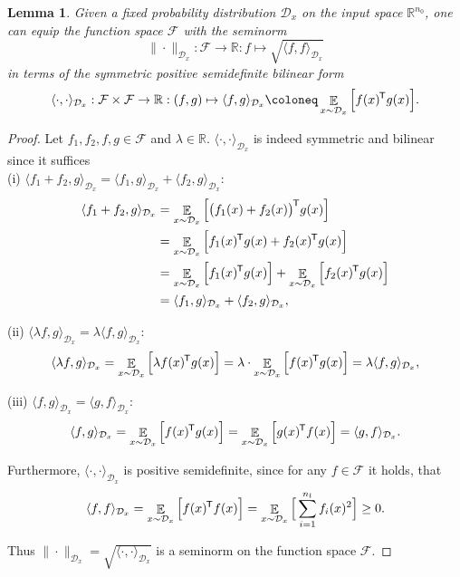 \documentclass[11pt, a4paper]{article}
\newtheorem{lemma}[theorem]{Lemma}
\newcommand{\R}{\mathbb{R}}
\newcommand{\D}{\mathcal{D}}
\newcommand{\F}{\mathcal{F}}
\newcommand*{\tr}{^{\mkern-1.5mu\mathsf{T}}}
\DeclareMathOperator*{\E}{\mathbb{E}}
\begin{document}
\begin{lemma}
Given a fixed probability distribution $\D_x$ on the input space $\R^{n_0}$, one can equip the function space $\F$ with the seminorm
\[ \| \cdot \|_{\D_x} : \F \to \R : f \mapsto \sqrt{\langle f , f \rangle_{\D_x}} \] 
in terms of the symmetric positive semidefinite bilinear form
\[ \langle \cdot,\cdot \rangle_{\D_x} : \F \times \F \to \R : (f,g) \mapsto \langle f,g \rangle_{\D_x} \coloneq \E_{x \sim \D_x} \Big [ f(x)\tr g(x) \Big ].\]
\end{lemma}

\begin{proof}
Let $f_1, f_2, f, g \in \F$ and $\lambda \in \R$. $\langle \cdot,\cdot \rangle_{\D_x}$ is indeed symmetric and bilinear since it suffices \\

(i) $\langle f_1 + f_2 , g \rangle_{\D_x} = \langle f_1 , g \rangle_{\D_x} + \langle f_2 , g \rangle_{\D_x}$:
\[ \begin{split}
\langle f_1 + f_2 , g \rangle_{\D_x}
&= \E_{x \sim \D_x} \Big [ \big ( f_1(x) + f_2(x) \big )\tr g(x) \Big ] \\\
&= \E_{x \sim \D_x} \Big [ f_1(x)\tr g(x) + f_2(x)\tr g(x) \Big ] \\\
&= \E_{x \sim \D_x} \Big [ f_1(x)\tr g(x) \Big ] + \E_{x \sim \D_x} \Big [ f_2(x)\tr g(x) \Big ] \\\
&= \langle f_1 , g \rangle_{\D_x} + \langle f_2 , g \rangle_{\D_x},
\end{split} \]

(ii) $\langle \lambda f , g \rangle_{\D_x} = \lambda \langle f, g \rangle_{\D_x}$:
\[ \langle \lambda f , g \rangle_{\D_x} = \E_{x \sim \D_x} \Big [ \lambda f(x)\tr g(x) \Big ] = \lambda \cdot \E_{x \sim \D_x} \Big [ f(x)\tr g(x) \Big ] = \lambda \langle f, g \rangle_{\D_x}, \]

(iii) $\langle f , g \rangle_{\D_x} = \langle g , f \rangle_{\D_x}$:
\[ \langle f , g \rangle_{\D_x} = \E_{x \sim \D_x} \Big [ f(x)\tr g(x) \Big ] = \E_{x \sim \D_x} \Big [ g(x)\tr f(x) \Big ] = \langle g , f \rangle_{\D_x}. \]

Furthermore, $\langle \cdot,\cdot \rangle_{\D_x}$ is positive semidefinite, since for any $f \in \F$ it holds, that
\[ \langle f , f \rangle_{\D_x} =  \E_{x \sim \D_x} \Big [ f(x)\tr f(x) \Big ] = \E_{x \sim \D_x} \Big [ \sum_{i=1}^{n_l} f_i(x)^2 \Big ] \geq 0. \]

Thus $\| \cdot \|_{\D_x} = \sqrt{\langle \cdot , \cdot \rangle_{\D_x}}$ is a seminorm on the function space $\F$.
\end{proof}
\end{document}
